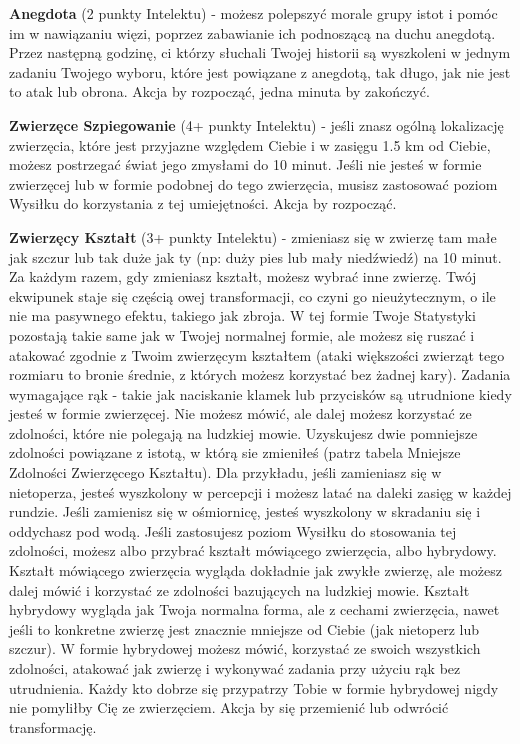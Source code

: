 \textbf{Anegdota}\label{sec:Anegdota} (2 punkty Intelektu) - możesz polepszyć morale grupy istot i pomóc im w nawiązaniu więzi, poprzez zabawianie ich podnoszącą na duchu anegdotą. Przez następną godzinę, ci którzy słuchali Twojej historii są wyszkoleni w jednym zadaniu Twojego wyboru, które jest powiązane z anegdotą, tak długo, jak nie jest to atak lub obrona. Akcja by rozpocząć, jedna minuta by zakończyć.

\textbf{Zwierzęce Szpiegowanie}\label{sec:Zwierzęce Szpiegowanie} (4+ punkty Intelektu) - jeśli znasz ogólną lokalizację zwierzęcia, które jest przyjazne względem Ciebie i w zasięgu 1.5 km od Ciebie, możesz postrzegać świat jego zmysłami do 10 minut. Jeśli nie jesteś w formie zwierzęcej lub w formie podobnej do tego zwierzęcia, musisz zastosować poziom Wysiłku do korzystania z tej umiejętności. Akcja by rozpocząć. 

\textbf{Zwierzęcy Kształt}\label{sec:Zwierzęcy Kształt} (3+ punkty Intelektu) - zmieniasz się w zwierzę tam małe jak szczur lub tak duże jak ty (np: duży pies lub mały niedźwiedź) na 10 minut. Za każdym razem, gdy zmieniasz kształt, możesz wybrać inne zwierzę. Twój ekwipunek staje się częścią owej transformacji, co czyni go nieużytecznym, o ile nie ma pasywnego efektu, takiego jak zbroja. W tej formie Twoje Statystyki pozostają takie same jak w Twojej normalnej formie, ale możesz się ruszać i atakować zgodnie z Twoim zwierzęcym kształtem (ataki większości zwierząt tego rozmiaru to bronie średnie, z których możesz korzystać bez żadnej kary). Zadania wymagające rąk - takie jak naciskanie klamek lub przycisków są utrudnione kiedy jesteś w formie zwierzęcej. Nie możesz mówić, ale dalej możesz korzystać ze zdolności, które nie polegają na ludzkiej mowie. Uzyskujesz dwie pomniejsze zdolności powiązane z istotą, w którą sie zmieniłeś (patrz tabela Mniejsze Zdolności Zwierzęcego Kształtu). Dla przykładu, jeśli zamieniasz się w nietoperza, jesteś wyszkolony w percepcji i możesz latać na daleki zasięg w każdej rundzie. Jeśli zamienisz się w ośmiornicę, jesteś wyszkolony w skradaniu się i oddychasz pod wodą. Jeśli zastosujesz poziom Wysiłku do stosowania tej zdolności, możesz albo przybrać kształt mówiącego zwierzęcia, albo hybrydowy. Kształt mówiącego zwierzęcia wygląda dokładnie jak zwykłe zwierzę, ale możesz dalej mówić i korzystać ze zdolności bazujących na ludzkiej mowie. Kształt hybrydowy wygląda jak Twoja normalna forma, ale z cechami zwierzęcia, nawet jeśli to konkretne zwierzę jest znacznie mniejsze od Ciebie (jak nietoperz lub szczur). W formie hybrydowej możesz mówić, korzystać ze swoich wszystkich zdolności, atakować jak zwierzę i wykonywać zadania przy użyciu rąk bez utrudnienia. Każdy kto dobrze się przypatrzy Tobie w formie hybrydowej nigdy nie pomyliłby Cię ze zwierzęciem. Akcja by się przemienić lub odwrócić transformację. 


